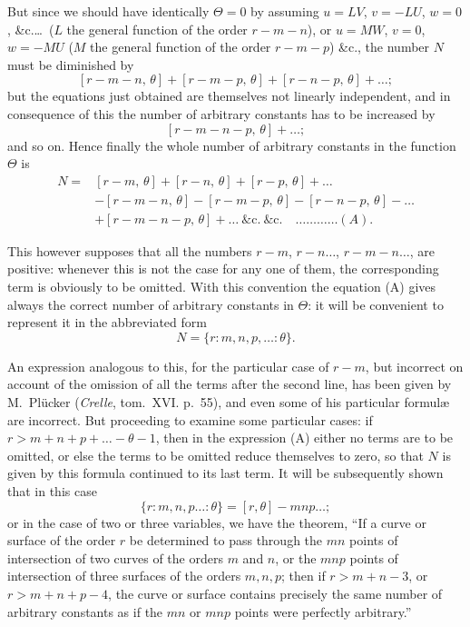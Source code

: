 \documentclass[11pt]{article}
\begin{document}
But since we should have identically $\Theta = 0$ by assuming $u = LV$, $v = -LU$, $w = 0$, \&c.\ldots\ ($L$ the general function of the order $r - m - n$), or $u = MW$, $v = 0$, $w = -MU$ ($M$ the general function of the order $r - m - p$) \&c., the number $N$ must be diminished by
\[
[r - m - n,\, \theta] + [r - m - p,\, \theta] + [r - n - p,\, \theta] + \ldots;
\]
but the equations just obtained are themselves not linearly independent, and in consequence of this the number of arbitrary constants has to be increased by
\[
[r - m - n - p,\, \theta] + \ldots;
\]
and so on. Hence finally the whole number of arbitrary constants in the function $\Theta$ is
\begin{align*}
N = {}& [r - m,\, \theta] + [r - n,\, \theta] + [r - p,\, \theta] + \ldots\\
& - [r - m - n,\, \theta] - [r - m - p,\, \theta] - [r - n - p,\, \theta] - \ldots\\
& + [r - m - n - p,\, \theta] + \ldots\ \&\mathrm{c.}\ \&\mathrm{c.}\quad \ldots\ldots\ldots\ldots (A).
\end{align*}

This however supposes that all the numbers $r - m$, $r - n \ldots$, $r - m - n \ldots$, are positive: whenever this is not the case for any one of them, the corresponding term is obviously to be omitted. With this convention the equation (A) gives always the correct number of arbitrary constants in $\Theta$: it will be convenient to represent it in the abbreviated form
\[
N = \{r : m, n, p, \ldots : \theta\}.
\]

An expression analogous to this, for the particular case of $r - m$, but incorrect on account of the omission of all the terms after the second line, has been given by M.~Pl\"ucker (\textit{Crelle}, tom.~XVI. p.~55), and even some of his particular formul\ae{} are incorrect. But proceeding to examine some particular cases: if $r > m + n + p + \ldots - \theta - 1$, then in the expression (A) either no terms are to be omitted, or else the terms to be omitted reduce themselves to zero, so that $N$ is given by this formula continued to its last term. It will be subsequently shown that in this case
\[
\{r : m, n, p \ldots : \theta\} = [r, \theta] - mnp \ldots;
\]
or in the case of two or three variables, we have the theorem, ``If a curve or surface of the order $r$ be determined to pass through the $mn$ points of intersection of two curves of the orders $m$ and $n$, or the $mnp$ points of intersection of three surfaces of the orders $m, n, p$; then if $r > m + n - 3$, or $r > m + n + p - 4$, the curve or surface contains precisely the same number of arbitrary constants as if the $mn$ or $mnp$ points were perfectly arbitrary.''
\end{document}
